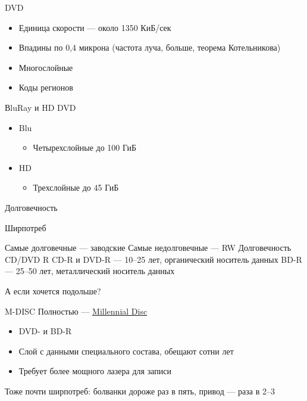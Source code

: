 \documentclass[xetex,aspectratio=43]{beamer}
\begin{document}
\begin{frame}{DVD}
        \begin{itemize}
            \tightlist
            \item
            Единица скорости --- около 1350 КиБ/сек
            \item
            Впадины по 0,4 микрона (частота луча, больше, теорема Котельникова)
            \item
            Многослойные
            \item
            Коды регионов
        \end{itemize}
\end{frame}

\begin{frame}{ВluRay и HD DVD}
        \begin{itemize}
            \tightlist
            \item
            Blu

            \begin{itemize}
                \tightlist
                \item
                Четырехслойные до 100 ГиБ
            \end{itemize}
            \item
            HD

            \begin{itemize}
                \tightlist
                \item
                Трехслойные до 45 ГиБ
            \end{itemize}
        \end{itemize}

\end{frame}

\begin{frame}{Долговечность}
    \begin{block}{Ширпотреб}
        \begin{outline}
            \1 Самые долговечные --- заводские
            \1 Самые недолговечные --- RW
            \1 Долговечность CD/DVD R
                \2 CD-R и DVD-R --- 10--25 лет, органический носитель данных
                \2 BD-R --- 25--50 лет, металлический носитель данных
        \end{outline}
    \end{block}
    \pause
    А если хочется подольше?
    \pause
    \begin{block}{M-DISC}
        Полностью --- \href{https://ru.wikipedia.org/wiki/M-DISC}{Millennial Disc}
        \begin{itemize}
            \item DVD- и BD-R
            \item Слой с данными специального состава, обещают сотни лет
            \item Требует более мощного лазера для записи
        \end{itemize}
        Тоже почти ширпотреб: болванки дороже раз в пять, привод --- раза в 2--3
    \end{block}
\end{frame}
\end{document}
